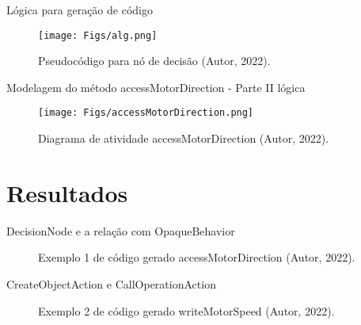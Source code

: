 \documentclass[handout,aspectratio = 169]{beamer}
\begin{document}
\begin{frame}{Lógica para geração de código}
    \begin{figure}
            \centering
             \texttt{[image: Figs/alg.png]}
            \caption{Pseudocódigo para nó de decisão (Autor, 2022).}
        \end{figure}
\end{frame}

\begin{frame}{Modelagem do método accessMotorDirection - Parte II lógica}
    \begin{figure}
            \centering
             \texttt{[image: Figs/accessMotorDirection.png]}
            \caption{Diagrama de atividade accessMotorDirection (Autor, 2022).}
        \end{figure}
\end{frame}



\section{Resultados}
\begin{frame}{DecisionNode e a relação com OpaqueBehavior}

\begin{figure}[htbp]
\centering
{} %
\quad %
\caption{Exemplo 1 de código gerado accessMotorDirection (Autor, 2022).}
\end{figure}

\end{frame}

\begin{frame}{CreateObjectAction e CallOperationAction}

\begin{figure}[htbp]
\centering
{} %
\quad %
\caption{Exemplo 2 de código gerado writeMotorSpeed (Autor, 2022).}
\end{figure}

\end{frame}
\end{document}
